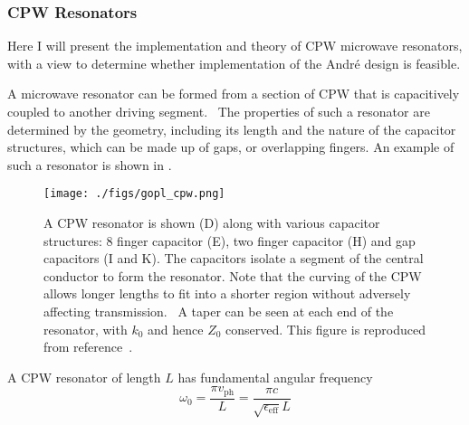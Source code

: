 \subsubsection{CPW Resonators}
\label{experiment:mw:resonator}

Here I will present the implementation and theory of CPW microwave resonators,
with a view to determine whether implementation of the Andr\'e design is
feasible.

A microwave resonator can be formed from a section of CPW that is capacitively
coupled to another driving segment.~\cite{Day2003} The properties of such a
resonator are determined by the geometry, including its length and the nature
of the capacitor structures, which can be made up of gaps, or overlapping
fingers. An example of such a resonator is shown in
.~\cite{doi:10.1063/1.3010859, Pain1999}

\begin{figure}
  \texttt{[image: ./figs/gopl\_cpw.png]}
  \caption{
    A CPW resonator is shown (D) along with various capacitor structures: 8
    finger capacitor (E), two finger capacitor (H) and gap capacitors (I and K).
    The capacitors isolate a segment of the central conductor to form the
    resonator. Note that the curving of the CPW allows longer lengths to fit
    into a shorter region without adversely affecting
    transmission.~\cite{Simons2004} A taper can be seen at each end of the
    resonator, with $k_0$ and hence $Z_0$ conserved.
    This figure is reproduced from reference~\cite{doi:10.1063/1.3010859}.
  }
  \label{experiment:fig:resonator}
\end{figure}

A CPW resonator of length $L$ has fundamental angular frequency
\begin{equation}
  \omega_0 = \frac{\pi v_\mathrm{ph}}{L} = \frac{\pi
  c}{\sqrt{\epsilon_\text{eff}} L}
\end{equation}

